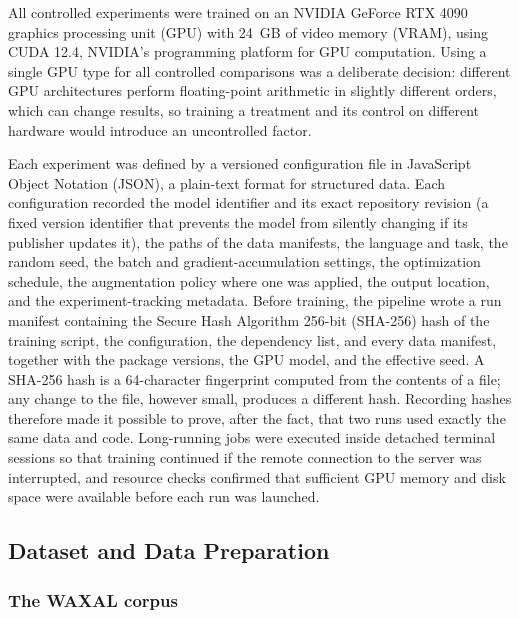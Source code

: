 All controlled experiments were trained on an NVIDIA GeForce RTX 4090 graphics
processing unit (GPU) with 24~GB of video memory (VRAM), using CUDA 12.4, NVIDIA's
programming platform for GPU computation.
Using a single GPU type for all controlled comparisons was a deliberate decision:
different GPU architectures perform floating-point arithmetic in slightly
different orders, which can change results, so training a treatment and its
control on different hardware would introduce an uncontrolled factor.

Each experiment was defined by a versioned configuration file in JavaScript
Object Notation (JSON), a plain-text format for structured data. Each
configuration recorded the model identifier and its exact repository revision
(a fixed version identifier that prevents the model from silently changing if
its publisher updates it), the paths of the data manifests, the language and
task, the random seed, the batch and gradient-accumulation settings, the
optimization schedule, the augmentation policy where one was applied, the output
location, and the experiment-tracking metadata. Before training, the pipeline
wrote a run manifest containing the Secure Hash Algorithm 256-bit (SHA-256) hash
of the training script, the configuration, the dependency list, and every data
manifest, together with the package versions, the GPU model, and the effective
seed. A SHA-256 hash is a 64-character fingerprint computed from the contents of a
file; any change to the file, however small, produces a different hash.
Recording hashes therefore made it possible to prove, after the fact, that two
runs used exactly the same data and code. Long-running jobs were executed inside
detached terminal sessions so that training continued if the remote connection
to the server was interrupted, and resource checks confirmed that sufficient GPU
memory and disk space were available before each run was launched.

\subsection{Dataset and Data Preparation}
\label{sec:data}

\subsubsection{The WAXAL corpus}

